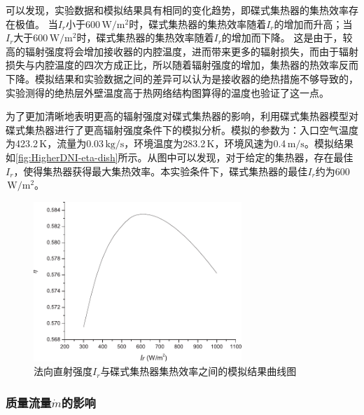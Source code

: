 可以发现，实验数据和模拟结果具有相同的变化趋势，即碟式集热器的集热效率存在极值。
当$I_r$小于600$\,\mathrm{W/m^2}$时，碟式集热器的集热效率随着$I_r$的增加而升高；当$I_r$大于600$\,\mathrm{W/m^2}$时，碟式集热器的集热效率随着$I_r$的增加而下降。
这是由于，较高的辐射强度将会增加接收器的内腔温度，进而带来更多的辐射损失，而由于辐射损失与内腔温度的四次方成正比，所以随着辐射强度的增加，集热器的热效率反而下降。模拟结果和实验数据之间的差异可以认为是接收器的绝热措施不够导致的，实验测得的绝热层外壁温度高于热网络结构图算得的温度也验证了这一点。

为了更加清晰地表明更高的辐射强度对碟式集热器的影响，利用碟式集热器模型对碟式集热器进行了更高辐射强度条件下的模拟分析。模拟的参数为：入口空气温度为423.2$\,\mathrm{K}$，流量为0.03$\,\mathrm{kg/s}$，环境温度为283.2$\,\mathrm{K}$，环境风速为0.4$\,\mathrm{m/s}$。模拟结果如\autoref{fig:HigherDNI-eta-dish}所示。从图中可以发现，对于给定的集热器，存在最佳$I_r$，使得集热器获得最大集热效率。本实验条件下，碟式集热器的最佳$I_r$约为600$\,\mathrm{W/m^2}$。

\begin{figure}[!ht]
\centering
\includegraphics[width=0.7\textwidth]{fig/HigherDNI-eta-dish}
\caption{法向直射强度$I_r$与碟式集热器集热效率之间的模拟结果曲线图}
\label{fig:HigherDNI-eta-dish}
\end{figure}



\subsubsection{质量流量$\dot{m}$的影响}

